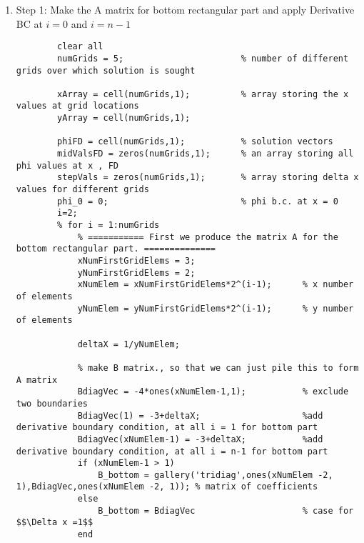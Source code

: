 \documentclass{article}
\begin{document}
\begin{enumerate}
    \item Step 1: Make the A matrix for bottom rectangular part and apply Derivative BC at $i=0$ and $i=n-1$\\
    \begin{lstlisting}
        clear all
        numGrids = 5;                       % number of different grids over which solution is sought

        xArray = cell(numGrids,1);          % array storing the x values at grid locations
        yArray = cell(numGrids,1);

        phiFD = cell(numGrids,1);           % solution vectors
        midValsFD = zeros(numGrids,1);      % an array storing all phi values at x , FD
        stepVals = zeros(numGrids,1);       % array storing delta x values for different grids
        phi_0 = 0;                          % phi b.c. at x = 0
        i=2;
        % for i = 1:numGrids
            % =========== First we produce the matrix A for the bottom rectangular part. ==============
            xNumFirstGridElems = 3;
            yNumFirstGridElems = 2; 
            xNumElem = xNumFirstGridElems*2^(i-1);      % x number of elements
            yNumElem = yNumFirstGridElems*2^(i-1);      % y number of elements

            deltaX = 1/yNumElem;

            % make B matrix., so that we can just pile this to form A matrix
            BdiagVec = -4*ones(xNumElem-1,1);           % exclude two boundaries
            BdiagVec(1) = -3+deltaX;                    %add derivative boundary condition, at all i = 1 for bottom part
            BdiagVec(xNumElem-1) = -3+deltaX;           %add derivative boundary condition, at all i = n-1 for bottom part
            if (xNumElem-1 > 1)
                B_bottom = gallery('tridiag',ones(xNumElem -2, 1),BdiagVec,ones(xNumElem -2, 1)); % matrix of coefficients
            else
                B_bottom = BdiagVec                     % case for $$\Delta x =1$$
            end


\end{lstlisting}
\end{enumerate}
\end{document}
